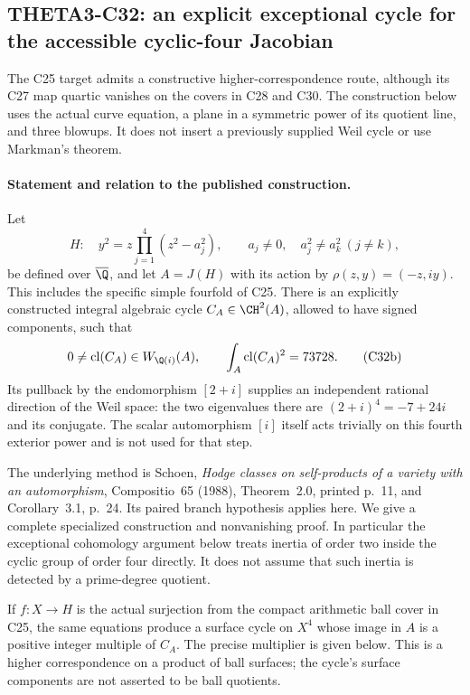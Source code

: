 \subsection{THETA3-C32: an explicit exceptional cycle for the accessible cyclic-four Jacobian}\label{C32}

The C25 target admits a constructive higher-correspondence
route, although its C27 map quartic vanishes on the covers
in C28 and C30.  The construction below uses the actual
curve equation, a plane in a symmetric power of its quotient
line, and three blowups.  It does not insert a previously
supplied Weil cycle or use Markman's theorem.

\paragraph{Statement and relation to the published construction.}
Let
\[
 H:\quad y^2=z\prod_{j=1}^4(z^2-a_j^2),
 \qquad a_j\ne0,\quad a_j^2\ne a_k^2\ (j\ne k),
                                                        \tag{C32a}
\]
be defined over $\overline\Q$, and let
$A=J(H)$ with its action by
$\rho(z,y)=(-z,iy)$.  This includes the specific
simple fourfold of C25.  There is an explicitly
constructed integral algebraic cycle
$C_A\in\CH^2(A)$, allowed to have signed components,
such that
\[
 0\ne\operatorname{cl}(C_A)\in W_{\Q(i)}(A),\qquad
                   \int_A\operatorname{cl}(C_A)^2=73728.
                                                        \tag{C32b}
\]
Its pullback by the endomorphism $[2+i]$ supplies an
independent rational direction of the Weil space:
the two eigenvalues there are $(2+i)^4=-7+24i$
and its conjugate.  The scalar automorphism $[i]$
itself acts trivially on this fourth exterior power
and is not used for that step.

The underlying method is Schoen,
\emph{Hodge classes on self-products of a variety
with an automorphism}, Compositio~65 (1988),
Theorem~2.0, printed p.~11, and Corollary~3.1,
p.~24.  Its paired branch hypothesis applies here.
We give a complete specialized construction and
nonvanishing proof.  In particular the exceptional
cohomology argument below treats inertia of order
two inside the cyclic group of order four directly.
It does not assume that such inertia is detected
by a prime-degree quotient.

If $f:X\to H$ is the actual surjection from the
compact arithmetic ball cover in C25, the same
equations produce a surface cycle on $X^4$ whose
image in $A$ is a positive integer multiple of
$C_A$.  The precise multiplier is given below.
This is a higher correspondence on a product of
ball surfaces; the cycle's surface components are
not asserted to be ball quotients.

